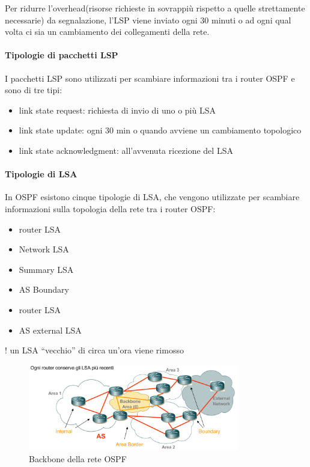 Per ridurre l'overhead(risorse richieste in sovrappiù rispetto a quelle strettamente necessarie) da segnalazione, l'LSP viene inviato ogni 30 minuti o ad ogni qual volta ci sia un cambiamento dei collegamenti della rete.

\paragraph{Tipologie di pacchetti LSP}
I pacchetti LSP sono utilizzati per scambiare informazioni tra i router OSPF e sono di tre tipi:
\begin{itemize}
    \item link state request: richiesta di invio di uno o più LSA
    \item link state update: ogni 30 min o quando avviene un cambiamento topologico
    \item link state acknowledgment: all'avvenuta ricezione del LSA
\end{itemize}
\paragraph{Tipologie di LSA}
In OSPF esistono cinque tipologie di LSA, che vengono utilizzate per scambiare informazioni sulla topologia della rete tra i router OSPF:
\begin{multicols}{2}
\begin{itemize}
    \item router LSA
    \item Network LSA
    \item Summary LSA
    \item AS Boundary
    \item router LSA
    \item AS external LSA
\end{itemize}
\end{multicols}
! un LSA “vecchio” di circa un'ora viene rimosso
\begin{figure}[h!]
    \centering
    \includegraphics[width=0.82\textwidth]{images/backbone.png}
    \caption{Backbone della rete OSPF}
    \label{fig:backbone}
\end{figure}

